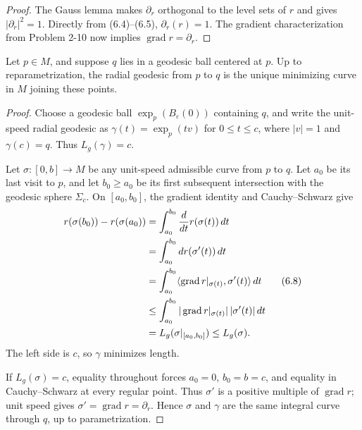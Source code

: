 \begin{proof}
\sketch
The Gauss lemma makes $\partial_r$ orthogonal to the level sets of $r$ and
gives $|\partial_r|^2=1$.  Directly from (6.4)--(6.5),
$\partial_r(r)=1$.  The gradient characterization from Problem 2-10 now
implies $\operatorname{grad}r=\partial_r$.
\end{proof}

\begin{proposition}
\label{prop:radial-geodesic-unique-minimizer}
\leanok

Let $p\in M$, and suppose $q$ lies in a geodesic ball centered at $p$.  Up to
reparametrization, the radial geodesic from $p$ to $q$ is the unique
minimizing curve in $M$ joining these points.
\end{proposition}

\begin{proof}
\sketch
Choose a geodesic ball $\exp_p(B_\varepsilon(0))$ containing $q$, and write
the unit-speed radial geodesic as
$\gamma(t)=\exp_p(tv)$ for $0\leq t\leq c$, where $|v|=1$ and
$\gamma(c)=q$.  Thus $L_g(\gamma)=c$.

Let $\sigma:[0,b]\to M$ be any unit-speed admissible curve from $p$ to $q$.
Let $a_0$ be its last visit to $p$, and let $b_0\geq a_0$ be its first
subsequent intersection with the geodesic sphere $\Sigma_c$.  On
$[a_0,b_0]$, the gradient identity and Cauchy--Schwarz give
\begin{align}
r(\sigma(b_0))-r(\sigma(a_0))
&=\int_{a_0}^{b_0}\frac{d}{dt}r(\sigma(t))\,dt \notag\\
&=\int_{a_0}^{b_0}dr(\sigma'(t))\,dt \notag\\
&=\int_{a_0}^{b_0}
\langle\operatorname{grad}r|_{\sigma(t)},\sigma'(t)\rangle\,dt \tag{6.8}\\
&\leq\int_{a_0}^{b_0}
|\operatorname{grad}r|_{\sigma(t)}|\,|\sigma'(t)|\,dt \notag\\
&=L_g(\sigma|_{[a_0,b_0]})\leq L_g(\sigma). \notag
\end{align}
The left side is $c$, so $\gamma$ minimizes length.

If $L_g(\sigma)=c$, equality throughout forces
$a_0=0$, $b_0=b=c$, and equality in Cauchy--Schwarz at every regular point.
Thus $\sigma'$ is a positive multiple of $\operatorname{grad}r$; unit speed
gives $\sigma'=\operatorname{grad}r=\partial_r$.  Hence $\sigma$ and $\gamma$
are the same integral curve through $q$, up to parametrization.
\end{proof}

